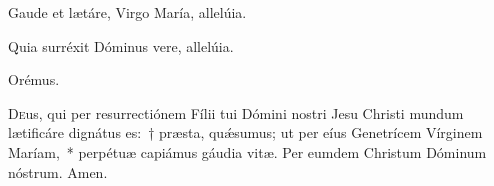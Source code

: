 
\vv Gaude et lætáre, Virgo María, allelúia.

\rr Quia surréxit Dóminus vere, allelúia.

Orémus.

\lettrine{D}{e}us, qui per resurrectiónem Fílii tui Dómini nostri Jesu Christi mundum lætificáre dignátus es:~† præsta, quǽsumus; ut per eíus Genetrícem Vírginem Maríam,~* perpétuæ capiámus gáudia vitæ. Per eumdem Christum Dóminum nóstrum. \rr Amen.